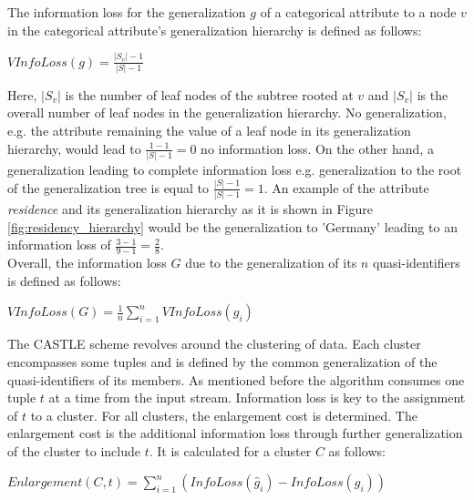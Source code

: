 The information loss for the generalization $g$ of a categorical attribute to a node $v$ in the categorical attribute's generalization hierarchy is defined as follows: 

\begin{center}
    $VInfoLoss(g) = \frac{|S_v| - 1}{|S| - 1}$
\end{center}

Here, $|S_v|$ is the number of leaf nodes of the subtree rooted at $v$ and $|S_v|$ is the overall number of leaf nodes in the generalization hierarchy. No generalization, e.g. the attribute remaining the value of a leaf node in its generalization hierarchy, would lead to $\frac{1-1}{|S| - 1} = 0$ no information loss. On the other hand, a generalization leading to complete information loss e.g. generalization to the root of the generalization tree is equal to $\frac{|S| - 1}{|S| - 1} = 1$. An example of the attribute \textit{residence} and its generalization hierarchy as it is shown in Figure \ref{fig:residency_hierarchy} would be the generalization to 'Germany' leading to an information loss of $\frac{3-1}{9-1} = \frac{2}{8}$. \\
Overall, the information loss $G$ due to the generalization of its $n$ quasi-identifiers is defined as follows: 

\begin{center}
    $VInfoLoss(G) = \frac{1}{n}\sum_{i=1}^{n}VInfoLoss(g_i)$
\end{center}

The CASTLE scheme revolves around the clustering of data. Each cluster encompasses some tuples and is defined by the common generalization of the quasi-identifiers of its members. As mentioned before the algorithm consumes one tuple $t$ at a time from the input stream. Information loss is key to the assignment of $t$ to a cluster. For all clusters, the enlargement cost is determined. The enlargement cost is the additional information loss through further generalization of the cluster to include $t$. It is calculated for a cluster $C$ as follows: 

\begin{center}
    $Enlargement(C,t) = \sum_{i=1}^{n}(InfoLoss(\hat{g}_i) - InfoLoss(g_i))$
\end{center}

